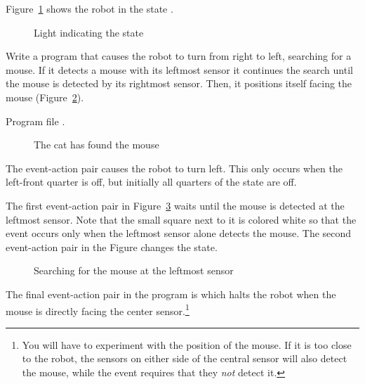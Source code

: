 Figure~\ref{fig.state-leds} shows the robot in the state .


\begin{figure}
\begin{center}
\caption{Light indicating the state}\label{fig.state-leds}
\end{center}
\end{figure}


Write a program that causes the robot to turn from right to left,
searching for a mouse. If it detects a mouse with its leftmost sensor it
continues the search until the mouse is detected by its rightmost
sensor. Then, it positions itself facing the mouse
(Figure~\ref{fig.cat-mouse}).

{\raggedleft \hfill Program file .}


\begin{figure}
\begin{center}
\caption{The cat has found the mouse}\label{fig.cat-mouse}
\end{center}
\end{figure}

The event-action pair  causes the robot to turn left. This
only occurs when the left-front quarter is off, but initially all
quarters of the state are off.

The first event-action pair in Figure~\ref{fig.mouse2} waits until the
mouse is detected at the leftmost sensor. Note that the small square
next to it is colored white so that the event occurs only when the
leftmost sensor alone detects the mouse. The second event-action pair in
the Figure changes the state.

\begin{figure}
\begin{center}
\caption{Searching for the mouse at the leftmost sensor}\label{fig.mouse2}
\end{center}
\end{figure}

The final event-action pair in the program is  which halts
the robot when the mouse is directly facing the center
sensor.\footnote{You will have to experiment with the position of the
mouse. If it is too close to the robot, the sensors on either side of
the central sensor will also detect the mouse, while the event requires
that they \emph{not} detect it.}

